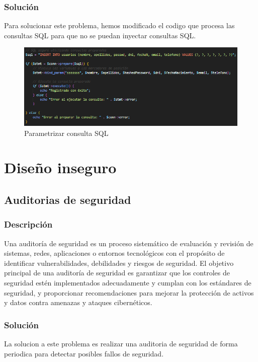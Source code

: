 \documentclass{report}
\begin{document}
                \subsubsection{Solución}
                    Para solucionar este problema, hemos modificado el codigo que procesa las consultas SQL para que no se puedan inyectar consultas SQL.
                    \begin{figure}[H]
                        \centering
                        \includegraphics[width=\textwidth]{./img/vulnerabilidades/3.3.1.1.png}
                        \caption{Parametrizar consulta SQL}
                    \end{figure}
        \clearpage
        \section{Diseño inseguro}
            \subsection{Auditorias de seguridad}
                \subsubsection{Descripción}
                    Una auditoría de seguridad es un proceso sistemático de evaluación y revisión de sistemas, redes, aplicaciones o entornos tecnológicos con el propósito de identificar vulnerabilidades, debilidades y riesgos de seguridad. El objetivo principal de una auditoría de seguridad es garantizar que los controles de seguridad estén implementados adecuadamente y cumplan con los estándares de seguridad, y proporcionar recomendaciones para mejorar la protección de activos y datos contra amenazas y ataques cibernéticos.
                \subsubsection{Solución}
                    La solucion a este problema es realizar una auditoria de seguridad de forma periodica para detectar posibles fallos de seguridad. 
\end{document}
